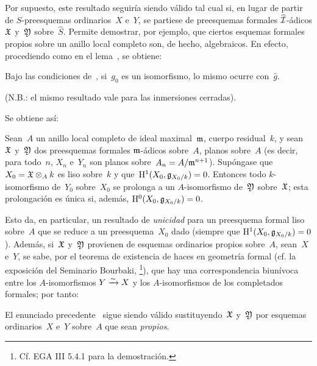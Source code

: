 
Por supuesto, este resultado seguiría siendo válido tal cual si, en lugar de partir de $S$-preesquemas ordinarios~$X$ e~$Y$, se partiese de preesquemas formales $\widehat{\cal{I}}$-ádicos
$\goth{X}$ y~$\goth{Y}$ sobre~$\widehat{S}$. Permite demostrar, por ejemplo, que ciertos esquemas formales propios sobre un anillo local completo son, de hecho, algebraicos. En efecto, procediendo como en el lema~, se obtiene:

\begin{corollaire}
\label{III.5.7}
Bajo las condiciones de~, si~$g_0$ es un isomorfismo, lo mismo ocurre con~$\widehat{g}$.
\end{corollaire}

\noindent
(N.B.: el mismo resultado vale para las inmersiones cerradas).

Se obtiene así:

\begin{proposition}
\label{III.5.8}
Sean~$A$ un anillo local completo de ideal maximal~$\goth{m}$,
cuerpo residual~$k$, y sean~$\goth{X}$ y~$\goth{Y}$ dos preesquemas formales $\goth{m}$-ádicos sobre~$A$, planos sobre~$A$ (es decir, para todo~$n$, $X_n$ e~$Y_n$ son planos sobre~$A_n=A/\goth{m}^{n+1}$). Supóngase que~$X_0=\goth{X}\otimes_Ak$ es liso sobre~$k$ y que~$\H^1(X_0,\goth{g}_{X_0/k})=0$. Entonces todo $k$-isomorfismo de~$Y_0$ sobre~$X_0$ se prolonga a un $A$-isomorfismo de~$\goth{Y}$ sobre~$\goth{X}$; esta prolongación es única si, además, $\H^0(X_0,\goth{g}_{X_0/k})=0$.
\end{proposition}

Esto da, en particular, un resultado de \emph{unicidad} para un preesquema formal liso sobre~$A$ que se reduce a un preesquema~$X_0$ dado (siempre que $\H^1(X_0,\goth{g}_{X_0/k})=0$). Además, si~$\goth{X}$ y~$\goth{Y}$ provienen de esquemas ordinarios propios sobre~$A$, sean~$X$ e~$Y$, se sabe, por el teorema de existencia de haces en geometría formal (cf. la exposición del Seminario Bourbaki, \footnote{Cf. EGA III 5.4.1 para la demostración.}), que hay una correspondencia biunívoca entre los $A$-isomorfismos $Y\isomto X$ y
los $A$-isomorfismos de los completados formales; por tanto:

\begin{corollaire}
\label{III.5.9}
El enunciado precedente~ sigue siendo válido sustituyendo~$\goth{X}$ y~$\goth{Y}$ por esquemas ordinarios~$X$ e~$Y$ sobre~$A$ que sean \emph{propios}.
\end{corollaire}

